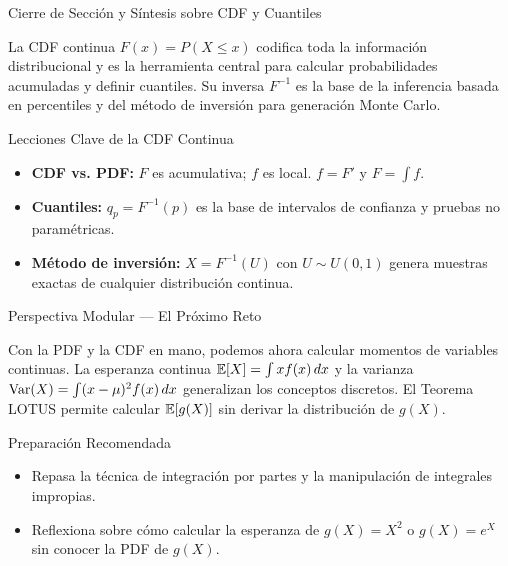 \documentclass[10pt, aspectratio=169]{beamer}
\begin{document}
\begin{frame}{Cierre de Sección y Síntesis sobre CDF y Cuantiles}
  \begin{reflexion}
    La CDF continua $F(x) = P(X \le x)$ codifica toda la información distribucional y es la herramienta central para calcular probabilidades acumuladas y definir cuantiles. Su inversa $F^{-1}$ es la base de la inferencia basada en percentiles y del método de inversión para generación Monte Carlo.
  \end{reflexion}

  \vspace{0.2cm}
  \pause
  \begin{block}{Lecciones Clave de la CDF Continua}
    \begin{itemize}\itemsep=0.08cm
      \item \textbf{CDF vs. PDF:} $F$ es acumulativa; $f$ es local. $f = F'$ y $F = \int f$.
      \item \textbf{Cuantiles:} $q_{p} = F^{-1}(p)$ es la base de intervalos de confianza y pruebas no paramétricas.
      \item \textbf{Método de inversión:} $X = F^{-1}(U)$ con $U \sim U(0, 1)$ genera muestras exactas de cualquier distribución continua.
    \end{itemize}
  \end{block}
\end{frame}

\begin{frame}{Perspectiva Modular --- El Próximo Reto}
  \scriptsize
  \begin{retoclase}
    Con la PDF y la CDF en mano, podemos ahora calcular momentos de variables continuas. La esperanza continua $\mathbb{E}[X] = \int x f(x)\,dx$ y la varianza $\operatorname{Var}(X) = \int (x - \mu)^{2} f(x)\,dx$ generalizan los conceptos discretos. El Teorema LOTUS permite calcular $\mathbb{E}[g(X)]$ sin derivar la distribución de $g(X)$.
  \end{retoclase}

  \vspace{0.08cm}
  \pause
  \begin{alertblock}{Preparación Recomendada}
    \begin{itemize}\itemsep=0.06cm
      \item Repasa la técnica de integración por partes y la manipulación de integrales impropias.
      \item Reflexiona sobre cómo calcular la esperanza de $g(X) = X^{2}$ o $g(X) = e^{X}$ sin conocer la PDF de $g(X)$.
    \end{itemize}
  \end{alertblock}
\end{frame}
\end{document}
